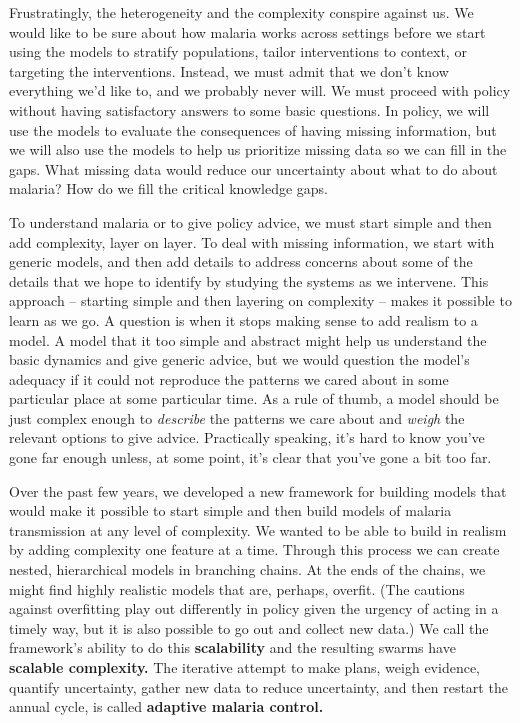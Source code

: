 \documentclass[
]{book}
\begin{document}
Frustratingly, the heterogeneity and the complexity conspire against us. We would like to be sure about how malaria works across settings before we start using the models to stratify populations, tailor interventions to context, or targeting the interventions. Instead, we must admit that we don't know everything we'd like to, and we probably never will. We must proceed with policy without having satisfactory answers to some basic questions. In policy, we will use the models to evaluate the consequences of having missing information, but we will also use the models to help us prioritize missing data so we can fill in the gaps. What missing data would reduce our uncertainty about what to do about malaria? How do we fill the critical knowledge gaps.

To understand malaria or to give policy advice, we must start simple and then add complexity, layer on layer. To deal with missing information, we start with generic models, and then add details to address concerns about some of the details that we hope to identify by studying the systems as we intervene. This approach -- starting simple and then layering on complexity -- makes it possible to learn as we go. A question is when it stops making sense to add realism to a model. A model that it too simple and abstract might help us understand the basic dynamics and give generic advice, but we would question the model's adequacy if it could not reproduce the patterns we cared about in some particular place at some particular time. As a rule of thumb, a model should be just complex enough to \emph{describe} the patterns we care about and \emph{weigh} the relevant options to give advice. Practically speaking, it's hard to know you've gone far enough unless, at some point, it's clear that you've gone a bit too far.

Over the past few years, we developed a new framework for building models that would make it possible to start simple and then build models of malaria transmission at any level of complexity. We wanted to be able to build in realism by adding complexity one feature at a time. Through this process we can create nested, hierarchical models in branching chains. At the ends of the chains, we might find highly realistic models that are, perhaps, overfit. (The cautions against overfitting play out differently in policy given the urgency of acting in a timely way, but it is also possible to go out and collect new data.) We call the framework's ability to do this \textbf{scalability} and the resulting swarms have \textbf{scalable complexity.} The iterative attempt to make plans, weigh evidence, quantify uncertainty, gather new data to reduce uncertainty, and then restart the annual cycle, is called \textbf{adaptive malaria control.}
\end{document}
